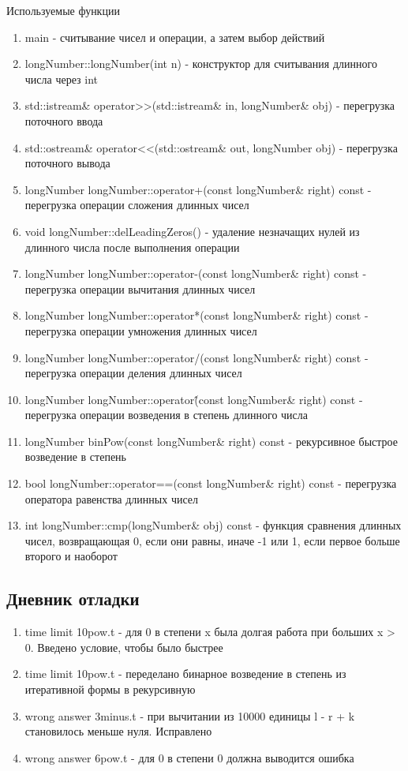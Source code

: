 \documentclass[12pt]{article}
\begin{document}
Используемые функции
\begin{enumerate}
\item main - считывание чисел и операции, а затем выбор действий
\item longNumber::longNumber(int n) - конструктор для считывания длинного числа через int
\item std::istream\& operator>>(std::istream\& in, longNumber\& obj) - перегрузка поточного ввода
\item std::ostream\& operator<<(std::ostream\& out, longNumber obj) - перегрузка поточного вывода
\item longNumber longNumber::operator+(const longNumber\& right) const - перегрузка операции сложения длинных чисел
\item void longNumber::delLeadingZeros() - удаление незначащих нулей из длинного числа после выполнения операции
\item longNumber longNumber::operator-(const longNumber\& right) const - перегрузка операции вычитания длинных чисел
\item longNumber longNumber::operator*(const longNumber\& right) const - перегрузка операции умножения длинных чисел
\item longNumber longNumber::operator/(const longNumber\& right) const - перегрузка операции деления длинных чисел
\item longNumber longNumber::operator\^(const longNumber\& right) const - перегрузка операции возведения в степень длинного числа
\item longNumber binPow(const longNumber\& right) const - рекурсивное быстрое возведение в степень
\item bool longNumber::operator==(const longNumber\& right) const - перегрузка оператора равенства длинных чисел
\item int longNumber::cmp(longNumber\& obj) const - функция сравнения длинных чисел, возвращающая 0, если они равны, иначе -1 или 1, если первое больше второго и наоборот
\end{enumerate}

\subsection*{Дневник отладки}
\begin{enumerate}
\item time limit 10pow.t - для 0 в степени x была долгая работа при больших x > 0. Введено условие, чтобы было быстрее
\item time limit 10pow.t - переделано бинарное возведение в степень из итеративной формы в рекурсивную
\item wrong answer 3minus.t - при вычитании из 10000 единицы l - r + k становилось меньше нуля. Исправлено
\item wrong answer 6pow.t - для 0 в степени 0 должна выводится ошибка
\end{enumerate}
\end{document}
